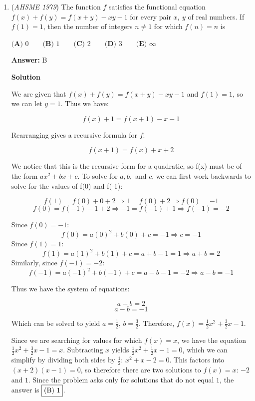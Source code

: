 \begin{enumerate}
	\item (\textit{AHSME 1979}) The function $f$ satisfies the functional equation $f(x) +f(y) = f(x + y ) - xy - 1$ for every pair $x,~ y$
of real numbers. If $f( 1) = 1$, then the number of integers $n \neq 1$ for which $f ( n ) = n$ is


 $\textbf{(A) }0\qquad \textbf{(B) }1\qquad \textbf{(C) }2\qquad \textbf{(D) }3\qquad \textbf{(E) }\infty$

 \textbf{Answer: }B



\textbf{Solution}

We are given that $f(x) +f(y) = f(x + y ) - xy - 1$ and $f( 1) = 1$, so we can let $y = 1$.  Thus we have:

 
 \[f(x) + 1 = f(x + 1) - x - 1\]

 Rearranging gives a recursive formula for $f$:

 
 \[f(x + 1) = f(x) + x + 2\]

 We notice that this is the recursive form for a quadratic, so f(x) must be of the form $ax^{2} + bx + c$.  To solve for $a, b,$ and $c$, we can first work backwards to solve for the values of f(0) and f(-1):

 
 \[f(1) = f(0) + 0 + 2 \Rightarrow 1 = f(0) + 2 \Rightarrow f(0) = -1\]
 \[f(0) = f(-1)  -1 + 2 \Rightarrow -1 = f(-1) + 1 \Rightarrow f(-1) = -2\]

 Since $f(0) = -1$:
 \[f(0) = a(0)^{2} + b(0) + c = -1 \Rightarrow c = -1\]  Since $f(1) = 1$: 
 \[f(1) = a(1)^{2} + b(1)+ c = a + b - 1 = 1 \Rightarrow a + b = 2\] Similarly, since $f(-1) = -2$:
 \[f(-1) = a(-1)^{2} + b(-1)+ c = a - b - 1 = -2 \Rightarrow a - b = -1\]

 Thus we have the system of equations:

 
 \[a + b = 2\]
 \[a - b = -1\]

 Which can be solved to yield $a = \frac{1}{2}$, $b = \frac{3}{2}$.  Therefore, $f(x) = \frac{1}{2} x^{2} + \frac{3}{2} x - 1$.

 Since we are searching for values for which $f(x) = x$, we have the equation $\frac{1}{2} x^{2} + \frac{3}{2} x - 1 = x$.  Subtracting $x$ yields $\frac{1}{2} x^{2} + \frac{1}{2} x - 1 = 0$, which we can simplify by dividing both sides by $\frac{1}{2}$: $x^{2} + x - 2 = 0$.  This factors into $(x + 2) (x - 1) = 0$, so therefore there are two solutions to $f(x) = x$: $-2$ and $1$.  Since the problem asks only for solutions that do not equal $1$, the answer is $\fbox{(B) 1}$.


\end{enumerate}
